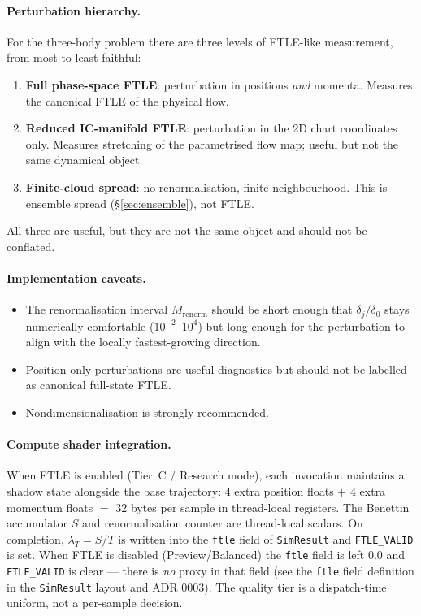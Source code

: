 \documentclass[11pt]{report}
\begin{document}
\paragraph{Perturbation hierarchy.} For the three-body problem there are three levels of FTLE-like measurement, from most to least faithful:
\begin{enumerate}[nosep]
\item \textbf{Full phase-space FTLE}: perturbation in positions \emph{and} momenta. Measures the canonical FTLE of the physical flow.
\item \textbf{Reduced IC-manifold FTLE}: perturbation in the 2D chart coordinates only. Measures stretching of the parametrised flow map; useful but not the same dynamical object.
\item \textbf{Finite-cloud spread}: no renormalisation, finite neighbourhood. This is ensemble spread (\S\ref{sec:ensemble}), not FTLE.
\end{enumerate}
All three are useful, but they are not the same object and should not be conflated.

\paragraph{Implementation caveats.}
\begin{itemize}[nosep]
\item The renormalisation interval $M_{\mathrm{renorm}}$ should be short enough that $\delta_j/\delta_0$ stays numerically comfortable ($10^{-2}$--$10^{4}$) but long enough for the perturbation to align with the locally fastest-growing direction.
\item Position-only perturbations are useful diagnostics but should not be labelled as canonical full-state FTLE.
\item Nondimensionalisation is strongly recommended.
\end{itemize}

\paragraph{Compute shader integration.} When FTLE is enabled (Tier~C / Research mode), each invocation maintains a shadow state alongside the base trajectory: 4 extra position floats $+$ 4 extra momentum floats $=$ 32 bytes per sample in thread-local registers. The Benettin accumulator $S$ and renormalisation counter are thread-local scalars. On completion, $\lambda_T=S/T$ is written into the \texttt{ftle} field of \texttt{SimResult} and \texttt{FTLE\_VALID} is set. When FTLE is disabled (Preview/Balanced) the \texttt{ftle} field is left $0.0$ and \texttt{FTLE\_VALID} is clear --- there is \emph{no} proxy in that field (see the \texttt{ftle} field definition in the \texttt{SimResult} layout and ADR 0003). The quality tier is a dispatch-time uniform, not a per-sample decision.
\end{document}
